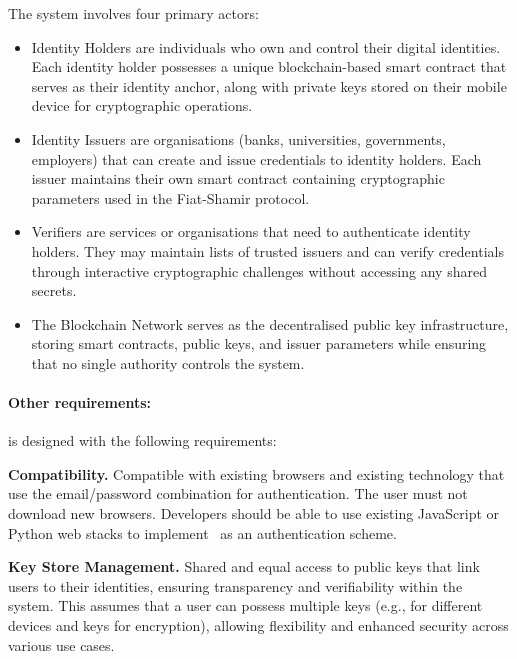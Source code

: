 The \deeid system involves four primary actors:

\begin{itemize}
    \item Identity Holders are individuals who own and control their digital identities. Each identity holder possesses a unique blockchain-based smart contract that serves as their identity anchor, along with private keys stored on their mobile device for cryptographic operations.
    
    \item Identity Issuers are organisations (banks, universities, governments, employers) that can create and issue credentials to identity holders. Each issuer maintains their own smart contract containing cryptographic parameters used in the Fiat-Shamir protocol.
    
    \item Verifiers are services or organisations that need to authenticate identity holders. They may maintain lists of trusted issuers and can verify credentials through interactive cryptographic challenges without accessing any shared secrets.
    
    \item The Blockchain Network serves as the decentralised public key infrastructure, storing smart contracts, public keys, and issuer parameters while ensuring that no single authority controls the system.
\end{itemize}




\paragraph*{Other requirements:} \deeid is designed with the following requirements:

\textbf{Compatibility.} Compatible with existing browsers and existing technology that use the email/password combination for authentication. The user must not download new browsers. Developers should be able to use existing JavaScript or Python web stacks to implement \deeid\ as an authentication scheme.

\textbf{Key Store Management.} Shared and equal access to public keys that link users to their identities, ensuring transparency and verifiability within the system. This assumes that a user can possess multiple keys (e.g., for different devices and keys for encryption), allowing flexibility and enhanced security across various use cases.

